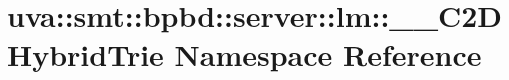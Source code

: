 \hypertarget{namespaceuva_1_1smt_1_1bpbd_1_1server_1_1lm_1_1_____c2_d_hybrid_trie}{}\section{uva\+:\+:smt\+:\+:bpbd\+:\+:server\+:\+:lm\+:\+:\+\_\+\+\_\+\+C2\+D\+Hybrid\+Trie Namespace Reference}
\label{namespaceuva_1_1smt_1_1bpbd_1_1server_1_1lm_1_1_____c2_d_hybrid_trie}
